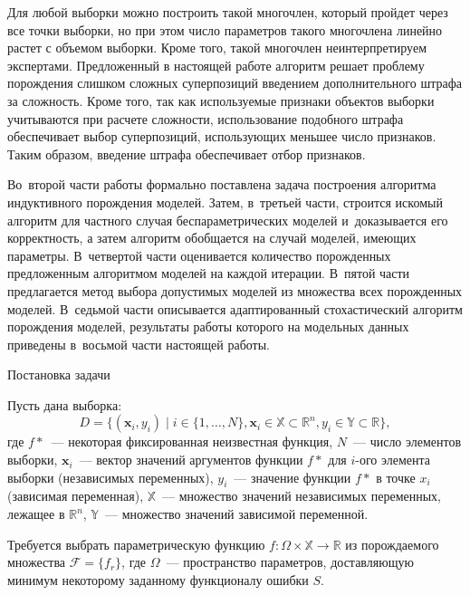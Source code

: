 \documentclass[12pt,a4paper]{article}
\makeatletter
\renewcommand{\section}{\@startsection {section}{1}
  \z@{2.7ex \@plus 1ex}{1.0ex}%
  {\normalfont}}
\makeatother
\begin{document}
Для любой выборки можно построить такой многочлен, который пройдет через
все точки выборки, но при этом число параметров такого многочлена линейно
растет с объемом выборки. Кроме того, такой многочлен неинтерпретируем
экспертами. Предложенный в настоящей работе алгоритм решает проблему
порождения слишком сложных суперпозиций введением дополнительного штрафа
за сложность. Кроме того, так как используемые признаки объектов выборки
учитываются при расчете сложности, использование подобного штрафа обеспечивает
выбор суперпозиций, использующих меньшее число признаков. Таким образом,
введение штрафа обеспечивает отбор признаков.

Во~второй части работы формально поставлена задача построения алгоритма
индуктивного порождения моделей. Затем, в~третьей части, строится искомый
алгоритм для частного случая беспараметрических моделей и~доказывается его
корректность, а затем алгоритм обобщается на случай моделей, имеющих параметры.
В~четвертой части оценивается количество порожденных предложенным алгоритмом
моделей на каждой итерации. В~пятой части предлагается метод выбора
допустимых моделей из множества всех порожденных моделей. В~седьмой части
описывается адаптированный стохастический алгоритм порождения моделей,
результаты работы которого на модельных данных приведены в~восьмой
части настоящей работы.

\section{Постановка задачи}

Пусть дана выборка:
\[
D = \{ (\mathbf{x}_i, y_i) \mid i \in \{1, \dots, N\},
			\mathbf{x}_i \in \mathbb{X} \subset \mathbb{R}^n,
			y_i \in \mathbb{Y} \subset \mathbb{R} \},
\]
где $f*$~--- некоторая фиксированная неизвестная функция, $N$~--- число элементов выборки,
$\mathbf{x}_i$~--- вектор значений аргументов функции $f*$ для $i$-ого элемента выборки
(независимых переменных), $y_i$~--- значение функции $f*$ в точке $x_i$ (зависимая переменная),
$\mathbb{X}$~--- множество значений независимых переменных, лежащее в
$\mathbb{R}^n$, $\mathbb{Y}$~--- множество значений зависимой переменной.

Требуется выбрать параметрическую функцию
$f : \Omega \times \mathbb{X} \rightarrow \mathbb{R}$ из
порождаемого множества $\mathcal{F} = \{ f_r \}$, где $\Omega$~--- пространство
параметров, доставляющую минимум некоторому заданному функционалу ошибки $S$.
\end{document}
